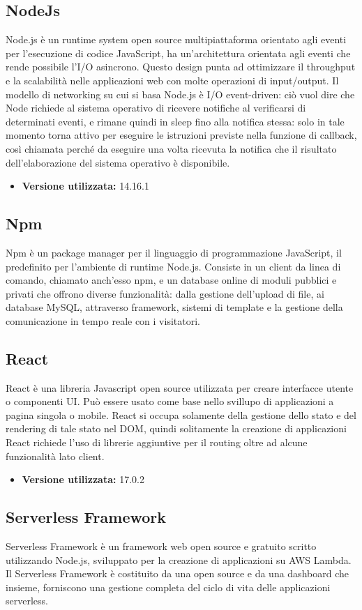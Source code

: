 \subsection{NodeJs}
Node.js è un runtime system open source multipiattaforma orientato agli eventi per l'esecuzione di codice JavaScript, ha un'architettura orientata agli eventi che rende possibile l’I/O asincrono. Questo design punta ad ottimizzare il throughput e la scalabilità nelle applicazioni web con molte operazioni di input/output.
Il modello di networking su cui si basa Node.js è I/O event-driven: ciò vuol dire che Node richiede al sistema operativo di ricevere notifiche al verificarsi di determinati eventi, e rimane quindi in sleep fino alla notifica stessa: solo in tale momento torna attivo per eseguire le istruzioni previste nella funzione di callback, così chiamata perché da eseguire una volta ricevuta la notifica che il risultato dell'elaborazione del sistema operativo è disponibile.
\begin{itemize}
    \item \textbf{Versione utilizzata:} 14.16.1
\end{itemize}
\subsection{Npm}
Npm è un package manager per il linguaggio di programmazione JavaScript, il predefinito per l'ambiente di runtime Node.js. Consiste in un client da linea di comando, chiamato anch'esso npm, e un database online di moduli pubblici e privati che offrono diverse funzionalità: dalla gestione dell’upload di file, ai database MySQL, attraverso framework, sistemi di template e la gestione della comunicazione in tempo reale con i visitatori.
\subsection{React}
React è una libreria Javascript open source utilizzata per creare interfacce utente o componenti UI. Può essere usato come base nello svillupo di applicazioni a pagina singola o mobile.
React si occupa solamente della gestione dello stato e del rendering di tale stato nel DOM, quindi solitamente la creazione di applicazioni React richiede l'uso di librerie aggiuntive per il routing oltre ad alcune funzionalità lato client.
\begin{itemize}
    \item \textbf{Versione utilizzata:} 17.0.2
\end{itemize}
\subsection{Serverless Framework}
Serverless Framework è un framework web open source e gratuito scritto utilizzando Node.js, sviluppato per la creazione di applicazioni su AWS Lambda. Il Serverless Framework è costituito da una  open source e da una dashboard che insieme, forniscono una gestione completa del ciclo di vita delle applicazioni serverless.
